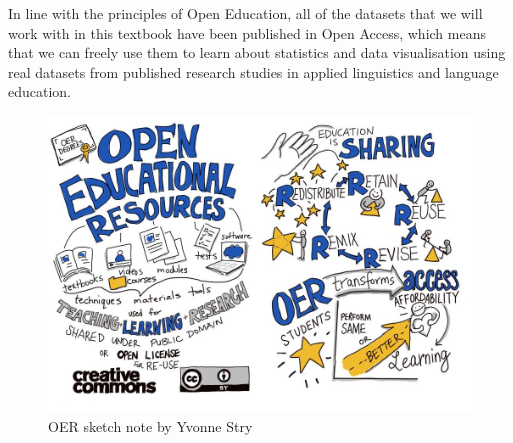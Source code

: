 \documentclass[
  letterpaper,
  DIV=11,
  numbers=noendperiod]{scrreprt}
\begin{document}
In line with the principles of Open Education, all of the datasets that
we will work with in this textbook have been published in Open Access,
which means that we can freely use them to learn about statistics and
data visualisation using real datasets from published research studies
in applied linguistics and language education.

\begin{figure}[H]

{\centering \includegraphics{images/oer.jpg}

}

\caption{OER sketch note by Yvonne Stry}

\end{figure}%
\end{document}
